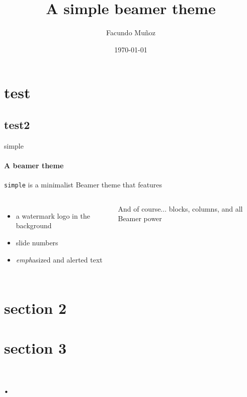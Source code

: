 \documentclass{beamer}
\title{A simple beamer theme}
\subtitle{}
\date{\today}
\author{Facundo Mu\~noz}
\institute{\url{http://github.com/famuvie}}
\begin{document}
\begin{frame}[plain]
\titlepage 
\end{frame}

\section{test}
\subsection{test2}
\begin{frame}{simple}
  \framesubtitle{A beamer theme}

  \texttt{simple} is a minimalist Beamer theme that features

  \begin{columns}
      \begin{itemize}
        \item a \alert{watermark} logo in the background
        \item slide \alert{numbers}
        \item \emph{emph}asized and \alert{alert}ed text
      \end{itemize}

      \begin{block}{And of course...}
         blocks, columns, and all Beamer power
      \end{block}
  \end{columns}

\end{frame}

\section{section 2}
\begin{frame}
\end{frame}

\section{section 3}
\begin{frame}
\end{frame}

\section{.}
\begin{frame}
\end{frame}
\end{document}
